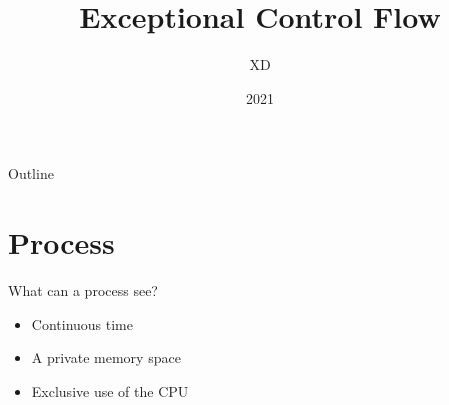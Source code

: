 \documentclass{beamer}
\title{Exceptional Control Flow}
\author{XD}
\institute{Peking University}
\date{2021}
\begin{document}
    \frame{\titlepage}
    \begin{frame}{Outline}
        \tableofcontents
    \end{frame}

    \section{Process}
    \begin{frame}{What can a process see?}
        \begin{itemize}
            \item Continuous time
            \item A private memory space
            \item Exclusive use of the CPU
        \end{itemize}
    \end{frame}
\end{document}
